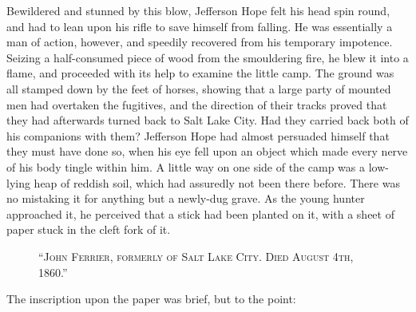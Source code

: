 \documentclass[12pt,english,oneside]{book}
\newcommand{\noun}[1]{\textsc{#1}}
\begin{document}
Bewildered and stunned by this blow, Jefferson Hope felt his head
spin round, and had to lean upon his rifle to save himself from falling.
He was essentially a man of action, however, and speedily recovered
from his temporary impotence. Seizing a half-consumed piece of wood
from the smouldering fire, he blew it into a flame, and proceeded
with its help to examine the little camp. The ground was all stamped
down by the feet of horses, showing that a large party of mounted
men had overtaken the fugitives, and the direction of their tracks
proved that they had afterwards turned back to Salt Lake City. Had
they carried back both of his companions with them? Jefferson Hope
had almost persuaded himself that they must have done so, when his
eye fell upon an object which made every nerve of his body tingle
within him. A little way on one side of the camp was a low-lying heap
of reddish soil, which had assuredly not been there before. There
was no mistaking it for anything but a newly-dug grave. As the young
hunter approached it, he perceived that a stick had been planted on
it, with a sheet of paper stuck in the cleft fork of it. %
\begin{figure}[htbp]
\noindent {}

\noindent \begin{center}\noun{{}``John Ferrier, formerly of Salt
Lake City. Died August 4th, 1860.''}\end{center}
\end{figure}
The inscription upon the paper was brief, but to the point:
\end{document}
